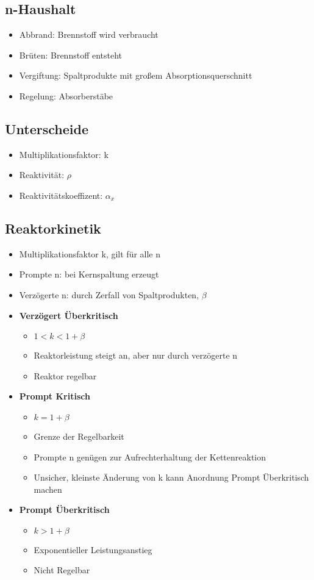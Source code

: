 \documentclass[12pt]{article}
\begin{document}
\subsection{n-Haushalt}
\begin{itemize}
	\item Abbrand: Brennstoff wird verbraucht
	\item Brüten: Brennstoff entsteht
	\item Vergiftung: Spaltprodukte mit großem Absorptionsquerschnitt
	\item Regelung: Absorberstäbe
\end{itemize}

\subsection{Unterscheide}
\begin{itemize}
	\item Multiplikationsfaktor: k
	\item Reaktivität: \(\rho\)
	\item Reaktivitätskoeffizent: \(\alpha_x\)
\end{itemize}

\subsection{Reaktorkinetik}
\begin{itemize}
	\item Multiplikationsfaktor k, gilt für alle n
	\item Prompte n: bei Kernspaltung erzeugt
	\item Verzögerte n: durch Zerfall von Spaltprodukten, \(\beta\)
	\item \textbf{Verzögert Überkritisch}
		\begin{itemize}
			\item \(1 < k < 1 + \beta\)
			\item Reaktorleistung steigt an, aber nur durch verzögerte n
			\item Reaktor regelbar
		\end{itemize}
	\item \textbf{Prompt Kritisch}
		\begin{itemize}
			\item \(k = 1 + \beta\)
			\item Grenze der Regelbarkeit
			\item Prompte n genügen zur Aufrechterhaltung der Kettenreaktion
			\item Unsicher, kleinste Änderung von k kann Anordnung Prompt Überkritisch machen
		\end{itemize}
	\item \textbf{Prompt Überkritisch}
		\begin{itemize}
			\item \(k > 1 + \beta\)
			\item Exponentieller Leistungsanstieg
			\item Nicht Regelbar
		\end{itemize}
\end{itemize}
\end{document}
